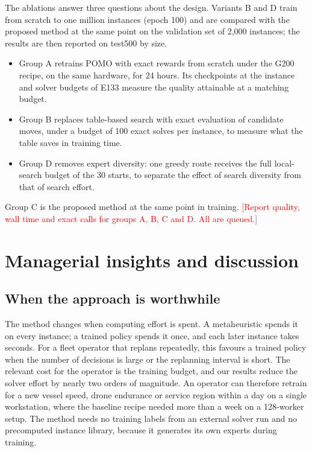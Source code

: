 \documentclass[preprint,12pt,authoryear]{elsarticle}
\newcommand{\placeholder}[1]{\textcolor{red}{[#1]}}
\begin{document}
The ablations answer three questions about the design. Variants B and D train from scratch to one million instances (epoch 100) and are compared with the proposed method at the same point on the validation set of 2,000 instances; the results are then reported on test500 by size.
\begin{itemize}
\item Group A retrains POMO with exact rewards from scratch under the G200 recipe, on the same hardware, for 24 hours. Its checkpoints at the instance and solver budgets of E133 measure the quality attainable at a matching budget.
\item Group B replaces table-based search with exact evaluation of candidate moves, under a budget of 100 exact solves per instance, to measure what the table saves in training time.
\item Group D removes expert diversity: one greedy route receives the full local-search budget of the 30 starts, to separate the effect of search diversity from that of search effort.
\end{itemize}
Group C is the proposed method at the same point in training. \placeholder{Report quality, wall time and exact calls for groups A, B, C and D. All are queued.}

\section{Managerial insights and discussion}
\label{sec:discussion}

\subsection{When the approach is worthwhile}

The method changes when computing effort is spent. A metaheuristic spends it on every instance; a trained policy spends it once, and each later instance takes seconds. For a fleet operator that replans repeatedly, this favours a trained policy when the number of decisions is large or the replanning interval is short. The relevant cost for the operator is the training budget, and our results reduce the solver effort by nearly two orders of magnitude. An operator can therefore retrain for a new vessel speed, drone endurance or service region within a day on a single workstation, where the baseline recipe needed more than a week on a 128-worker setup. The method needs no training labels from an external solver run and no precomputed instance library, because it generates its own experts during training.
\end{document}
